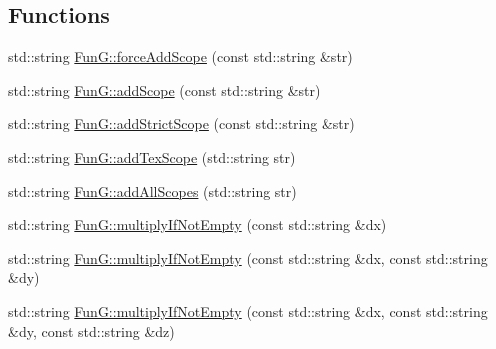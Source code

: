 \subsection*{Functions}
\begin{DoxyCompactItemize}
\item 
std\-::string \hyperlink{namespaceFunG_ab53219fedaf7327fc9a4672f1d2eb2f9}{Fun\-G\-::force\-Add\-Scope} (const std\-::string \&str)
\item 
std\-::string \hyperlink{namespaceFunG_a5dbb2eda96a2ba227a25bf4d5fdd45b7}{Fun\-G\-::add\-Scope} (const std\-::string \&str)
\item 
std\-::string \hyperlink{namespaceFunG_aab80cce1c3236f9056ff38ffe0649e9a}{Fun\-G\-::add\-Strict\-Scope} (const std\-::string \&str)
\item 
std\-::string \hyperlink{namespaceFunG_a87878f850f8f115f4e7b6de21cdde6dc}{Fun\-G\-::add\-Tex\-Scope} (std\-::string str)
\item 
std\-::string \hyperlink{namespaceFunG_a6740837e0a42b7968c15d005890ae5f7}{Fun\-G\-::add\-All\-Scopes} (std\-::string str)
\item 
std\-::string \hyperlink{namespaceFunG_a502b373ca98741d24c2375f5a6fc9773}{Fun\-G\-::multiply\-If\-Not\-Empty} (const std\-::string \&dx)
\item 
std\-::string \hyperlink{namespaceFunG_a0111473091231d0560392df37c771d26}{Fun\-G\-::multiply\-If\-Not\-Empty} (const std\-::string \&dx, const std\-::string \&dy)
\item 
std\-::string \hyperlink{namespaceFunG_a2df36bba8d082bdd76604be66ae94f26}{Fun\-G\-::multiply\-If\-Not\-Empty} (const std\-::string \&dx, const std\-::string \&dy, const std\-::string \&dz)
\end{DoxyCompactItemize}
